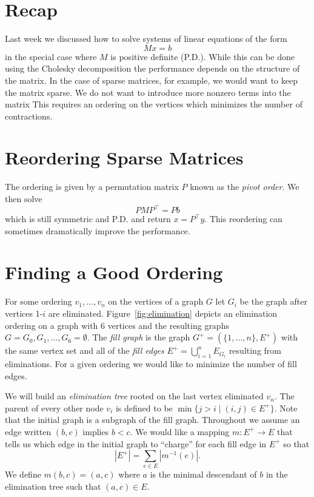 \documentclass{article}
\begin{document}

\section{Recap}

Last week we discussed how to solve systems of linear equations of the form
\[ Mx = b\]
in the special case where $M$ is positive definite (P.D.).
While this can be done using the Cholesky decomposition the performance depends on the structure of the matrix.
In the case of sparse matrices, for example, we would want to keep the matrix sparse.
We do not want to introduce more nonzero terms into the matrix
This requires an ordering on the vertices which minimizes the number of contractions.

\section{Reordering Sparse Matrices}

The ordering is given by a permutation matrix $P$ known as the \emph{pivot order}.
We then solve
\[ P M P^\top = Pb \]
which is still symmetric and P.D. and return $x = P^\top y$.
This reordering can sometimes dramatically improve the performance.

\section{Finding a Good Ordering}



For some ordering $v_1,\ldots, v_n$ on the vertices of a graph $G$ let $G_i$ be the graph after vertices 1-$i$ are eliminated.
Figure~\ref{fig:elimination} depicts an elimination ordering on a graph with $6$ vertices and the resulting graphs $G=G_0, G_1,\ldots, G_6=\emptyset$.
The \emph{fill graph} is the graph $G^+ = (\{1,\ldots, n\}, E^+)$ with the same vertex set and all of the \emph{fill edges} $E^+ = \bigcup_{i=1}^n E_{G_i}$ resulting from eliminations.
For a given ordering we would like to minimize the number of fill edges.

We will build an \emph{elimination tree} rooted on the last vertex eliminated $v_n$.
The parent of every other node $v_i$ is defined to be $\min\{j > i\mid (i,j)\in E^+\}$.
Note that the initial graph is a subgraph of the fill graph.
Throughout we assume an edge written $(b, c)$ implies $b < c$.
We would like a mapping $m:E^+\to E$ that tells us which edge in the initial graph to ``charge'' for each fill edge in $E^+$ so that
\[ | E^+ | = \sum_{e\in E} |m^{-1}(e)|. \]
We define $m(b, c) = (a, c)$ where $a$ is the minimal descendant of $b$ in the elimination tree such that $(a, c)\in E$.
\end{document}

